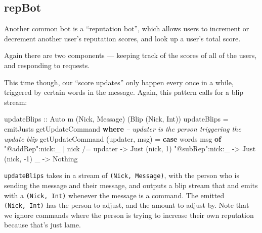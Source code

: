 \documentclass[]{article}
\newenvironment{Shaded}{}{}
\newcommand{\CommentTok}[1]{\textcolor[rgb]{0.38,0.63,0.69}{\textit{#1}}}
\newcommand{\DataTypeTok}[1]{\textcolor[rgb]{0.56,0.13,0.00}{#1}}
\newcommand{\DecValTok}[1]{\textcolor[rgb]{0.25,0.63,0.44}{#1}}
\newcommand{\FunctionTok}[1]{\textcolor[rgb]{0.02,0.16,0.49}{#1}}
\newcommand{\KeywordTok}[1]{\textcolor[rgb]{0.00,0.44,0.13}{\textbf{#1}}}
\newcommand{\NormalTok}[1]{#1}
\newcommand{\OtherTok}[1]{\textcolor[rgb]{0.00,0.44,0.13}{#1}}
\newcommand{\StringTok}[1]{\textcolor[rgb]{0.25,0.44,0.63}{#1}}
\begin{document}
\hypertarget{repbot}{%
\subsection{repBot}\label{repbot}}

Another common bot is a ``reputation bot'', which allows users to increment or
decrement another user's reputation scores, and look up a user's total score.

Again there are two components --- keeping track of the scores of all of the
users, and responding to requests.

This time though, our ``score updates'' only happen every once in a while,
triggered by certain words in the message. Again, this pattern calls for a blip
stream:

\begin{Shaded}
\begin{Highlighting}[]
\OtherTok{updateBlips ::} \DataTypeTok{Auto}\NormalTok{ m (}\DataTypeTok{Nick}\NormalTok{, }\DataTypeTok{Message}\NormalTok{) (}\DataTypeTok{Blip}\NormalTok{ (}\DataTypeTok{Nick}\NormalTok{, }\DataTypeTok{Int}\NormalTok{))}
\NormalTok{updateBlips }\FunctionTok{=}\NormalTok{ emitJusts getUpdateCommand}
  \KeywordTok{where}
    \CommentTok{-- updater is the person triggering the update blip}
\NormalTok{    getUpdateCommand (updater, msg) }\FunctionTok{=}
      \KeywordTok{case}\NormalTok{ words msg }\KeywordTok{of}
        \StringTok{"@addRep"}\FunctionTok{:}\NormalTok{nick}\FunctionTok{:}\NormalTok{_ }\FunctionTok{|}\NormalTok{ nick }\FunctionTok{/=}\NormalTok{ updater }\OtherTok{->} \DataTypeTok{Just}\NormalTok{ (nick, }\DecValTok{1}\NormalTok{)}
        \StringTok{"@subRep"}\FunctionTok{:}\NormalTok{nick}\FunctionTok{:}\NormalTok{_                   }\OtherTok{->} \DataTypeTok{Just}\NormalTok{ (nick, }\FunctionTok{-}\DecValTok{1}\NormalTok{)}
\NormalTok{        _                                  }\OtherTok{->} \DataTypeTok{Nothing}
\end{Highlighting}
\end{Shaded}

\texttt{updateBlips} takes in a stream of \texttt{(Nick,\ Message)}, with the
person who is sending the message and their message, and outputs a blip stream
that and emits with a \texttt{(Nick,\ Int)} whenever the message is a command.
The emitted \texttt{(Nick,\ Int)} has the person to adjust, and the amount to
adjust by. Note that we ignore commands where the person is trying to increase
their own reputation because that's just lame.
\end{document}
